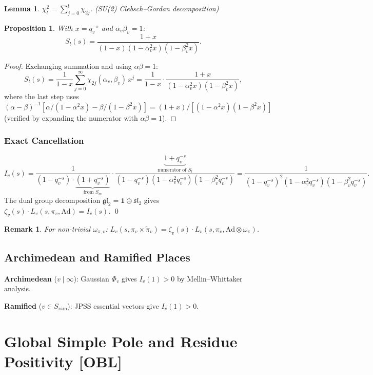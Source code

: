 \documentclass[12pt]{article}
\newtheorem{lemma}[theorem]{Lemma}
\newtheorem{proposition}[theorem]{Proposition}
\newtheorem{remark}[theorem]{Remark}
\begin{document}
\begin{lemma}
$\chi_l^2 = \sum_{j=0}^l \chi_{2j}$. (SU(2) Clebsch--Gordan decomposition)
\end{lemma}

\begin{proposition}
With $x = q_v^{-s}$ and $\alpha_v\beta_v = 1$:
\[
  S_l(s) = \frac{1+x}{(1-x)(1-\alpha_v^2 x)(1-\beta_v^2 x)}.
\]
\end{proposition}

\begin{proof}
Exchanging summation and using $\alpha\beta=1$:
\[
  S_l(s) = \frac{1}{1-x}\sum_{j=0}^\infty \chi_{2j}(\alpha_v,\beta_v)\,x^j
  = \frac{1}{1-x}\cdot\frac{1+x}{(1-\alpha_v^2 x)(1-\beta_v^2 x)},
\]
where the last step uses $(\alpha-\beta)^{-1}[\alpha/(1-\alpha^2 x) - \beta/(1-\beta^2 x)]
= (1+x)/[(1-\alpha^2 x)(1-\beta^2 x)]$ (verified by expanding the numerator with $\alpha\beta=1$).
\end{proof}

\subsubsection*{Exact Cancellation}

\[
  I_v(s)
  = \frac{1}{(1-q_v^{-s})\cdot\underbrace{(1+q_v^{-s})}_{\text{from }S_m}}
   \cdot \frac{\underbrace{1+q_v^{-s}}_{\text{numerator of }S_l}}{(1-q_v^{-s})(1-\alpha_v^2 q_v^{-s})(1-\beta_v^2 q_v^{-s})}
  = \frac{1}{(1-q_v^{-s})^2(1-\alpha_v^2 q_v^{-s})(1-\beta_v^2 q_v^{-s})}.
\]
The dual group decomposition $\mathfrak{gl}_2 = \mathbf{1}\oplus\mathfrak{sl}_2$ gives
$\zeta_v(s)\cdot L_v(s,\pi_v,\mathrm{Ad}) = I_v(s)$. \qed

\begin{remark}
For non-trivial $\omega_{\pi,v}$: $L_v(s,\pi_v\times\tilde\pi_v) = \zeta_v(s)\cdot L_v(s,\pi_v,\mathrm{Ad}\otimes\omega_\pi)$.
\end{remark}

\subsection{Archimedean and Ramified Places}

\textbf{Archimedean} ($v\mid\infty$): Gaussian $\Phi_v$ gives $I_v(1) > 0$ by Mellin--Whittaker analysis.

\textbf{Ramified} ($v\in S_{\mathrm{ram}}$): JPSS essential vectors give $I_v(1) > 0$.

\section{Global Simple Pole and Residue Positivity [OBL]}
\end{document}
